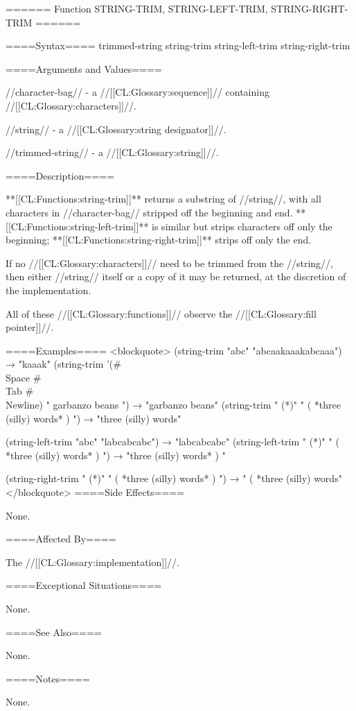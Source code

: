 ====== Function STRING-TRIM, STRING-LEFT-TRIM, STRING-RIGHT-TRIM ======

====Syntax====  {trimmed-string} {string-trim string-left-trim string-right-trim}

====Arguments and Values====

//character-bag// - a //[[CL:Glossary:sequence]]// containing //[[CL:Glossary:characters]]//.

//string// - a //[[CL:Glossary:string designator]]//.

//trimmed-string// - a //[[CL:Glossary:string]]//.

====Description====

**[[CL:Functions:string-trim]]** returns a substring of //string//, with all characters in //character-bag// stripped off the beginning and end. **[[CL:Functions:string-left-trim]]** is similar but strips characters off only the beginning; **[[CL:Functions:string-right-trim]]** strips off only the end.

If no //[[CL:Glossary:characters]]// need to be trimmed from the //string//, then either //string// itself or a copy of it may be returned, at the discretion of the implementation.

All of these //[[CL:Glossary:functions]]// observe the //[[CL:Glossary:fill pointer]]//.

====Examples==== <blockquote> (string-trim "abc" "abcaakaaakabcaaa") → "kaaak" (string-trim '(#\\Space #\\Tab #\\Newline) " garbanzo beans ") → "garbanzo beans" (string-trim " (*)" " ( *three (silly) words* ) ") → "three (silly) words"

(string-left-trim "abc" "labcabcabc") → "labcabcabc" (string-left-trim " (*)" " ( *three (silly) words* ) ") → "three (silly) words* ) "

(string-right-trim " (*)" " ( *three (silly) words* ) ") → " ( *three (silly) words" </blockquote> ====Side Effects====

None.

====Affected By====

The //[[CL:Glossary:implementation]]//.

====Exceptional Situations====

None.

====See Also====

None.

====Notes====

None.

